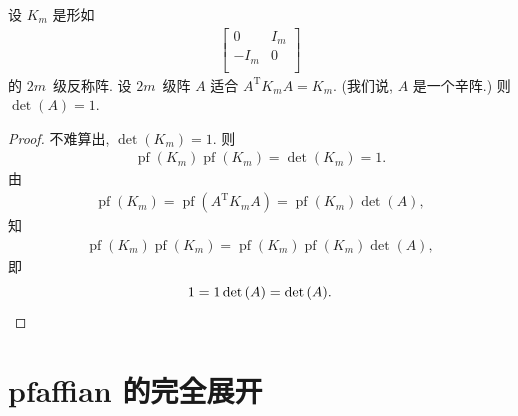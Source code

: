 \documentclass[../libro.tex]{subfiles}
\begin{document}
\begin{theorem}
    设 \(K_m\) 是形如
    \begin{align*}
        \begin{bmatrix}
            0    & I_m \\
            -I_m & 0   \\
        \end{bmatrix}
    \end{align*}
    的 \(2m\)~级反称阵.
    设 \(2m\)~级阵 \(A\) 适合
    \(A^{\mathrm{T}} K_m A = K_m\).
    (我们说, \(A\) 是一个辛阵.)
    则 \(\det {(A)} = 1\).
\end{theorem}

\begin{proof}
    不难算出, \(\det {(K_m)} = 1\).
    则
    \begin{align*}
        \operatorname{pf} {(K_m)} \operatorname{pf} {(K_m)}
        = \det {(K_m)} = 1.
    \end{align*}
    由
    \begin{align*}
        \operatorname{pf} {(K_m)}
        = \operatorname{pf} {(A^{\mathrm{T}} K_m A)}
        = \operatorname{pf} {(K_m)} \det {(A)},
    \end{align*}
    知
    \begin{align*}
        \operatorname{pf} {(K_m)} \operatorname{pf} {(K_m)}
        = \operatorname{pf} {(K_m)} \operatorname{pf} {(K_m)} \det {(A)},
    \end{align*}
    即
    \begin{equation*}
        1 = 1 \det {(A)} = \det {(A)}.
        \qedhere
    \end{equation*}
\end{proof}


\section{pfaffian 的完全展开}
\end{document}
